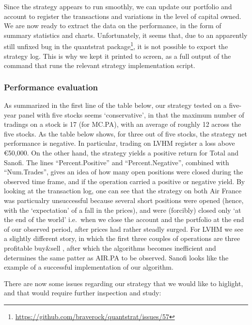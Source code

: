 \documentclass[
  11pt,
]{article}
\begin{document}
Since the strategy appears to run smoothly, we can update our portfolio
and account to register the transactions and variations in the level of
capital owned. We are now ready to extract the data on the performance,
in the form of summary statistics and charts. Unfortunately, it seems
that, due to an apparently still unfixed bug in the quantstrat
package\footnote{\url{https://github.com/braverock/quantstrat/issues/57}},
it is not possible to export the strategy log. This is why we kept it
printed to screen, as a full output of the command that runs the
relevant strategy implementation script.

\hypertarget{performance-evaluation}{%
\subsubsection{Performance evaluation}\label{performance-evaluation}}

As summarized in the first line of the table below, our strategy tested
on a five-year panel with five stocks seems `conservative', in that the
maximum number of tradings on a stock is 17 (for MC.PA), with an average
of roughly 12 across the five stocks. As the table below shows, for
three out of five stocks, the strategy net performance is negative. In
particular, trading on LVHM register a loss above €50,000. On the other
hand, the strategy yields a positive return for Total and Sanofi. The
lines ``Percent.Positive'' and ``Percent.Negative'', combined with
``Num.Trades'', gives an idea of how many open positions were closed
during the observed time frame, and if the operation carried a positive
or negative yield. By looking at the transaction log, one can see that
the strategy on both Air France was particualry unsuccessful because
several short positions were opened (hence, with the `expectation' of a
fall in the prices), and were (forcibly) closed only `at the end of the
world' i.e.~when we close the account and the portfolio at the end of
our observed period, after prices had rather steadly surged. For LVHM we
see a slightly different story, in which the first three couples of
operations are three profitable buy\&sell , after which the algorithms
becomes inefficient and determines the same patter as AIR.PA to be
observed. Sanofi looks like the example of a successful implementation
of our algorithm.

There are now some issues regarding our strategy that we would like to
higlight, and that would require further inspection and study:
\end{document}
